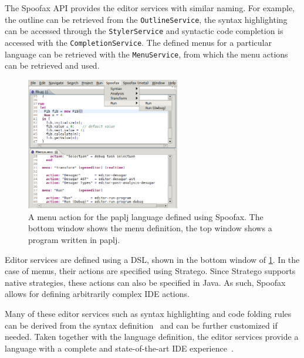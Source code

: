 The Spoofax API provides the editor services with similar naming. For
example, the outline can be retrieved from the \texttt{OutlineService}, the
syntax highlighting can be accessed through the \texttt{StylerService} and
syntactic code completion is accessed with the
\texttt{CompletionService}. The defined menus for a particular language can
be retrieved with the \texttt{MenuService}, from which the menu actions can
be retrieved and used.

\begin{figure}[htb]
\centering
\includegraphics[width=0.6\textwidth]{./img/menu-actions.png}
\caption{\label{fig:menu-actions}
A menu action for the paplj language defined using Spoofax. The bottom window shows the menu definition, the top window shows a program written in paplj.}
\end{figure}

Editor services are defined using a DSL, shown in the bottom window of
\cref{fig:menu-actions}. In the case of menus, their actions are
specified using Stratego. Since Stratego supports native strategies,
these actions can also be specified in Java. As such, Spoofax allows
for defining arbitrarily complex IDE actions.

Many of these editor services such as syntax highlighting and code
folding rules can be derived from the syntax
definition~\cite{Kats10c} and can be further customized if
needed. Taken together with the language definition, the editor
services provide a language with a complete and state-of-the-art IDE
experience~\cite{Kats10a}.
